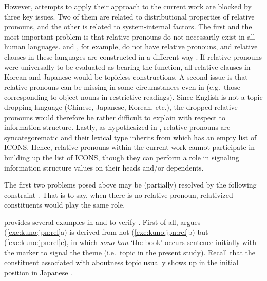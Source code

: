 

However, attempts to apply their approach to the current work are
blocked by three key issues. Two of them are
related to distributional properties of relative pronouns, and the
other is related to system-internal factors.  The first and the most
important problem is that relative pronouns do not necessarily exist
in all human languages.  and , for example,
do not have relative pronouns, and relative clauses in these languages
are constructed in a different way \citep{baldwin:98,kim:park:00}. If
relative pronouns were universally to be evaluated as bearing the
 function, all relative clauses in Korean and Japanese would be
topicless constructions.
A second issue is that relative pronouns can
be missing in some circumstances even in  (e.g.\ those
corresponding to object nouns in restrictive readings). Since English
is not a topic dropping language (Chinese, Japanese, Korean, etc.),
the dropped relative pronouns would therefore be rather difficult to
explain with respect to information structure.
Lastly, as hypothesized in , relative pronouns
are syncategorematic and their lexical type inherits from
 which has an empty list of ICONS. Hence,
relative pronouns within the current work cannot participate in
building up the list of ICONS, though they can perform a role in
signaling information structure values on their heads and/or
dependents.





The first two problems posed above may be (partially) resolved by the
following constraint \citep[19f]{bresnan:mchombo:87}. That is to say, when there is no relative pronoun,
relativized constituents would play the same role.



\noindent \citeauthor{kuno:76} provides several examples in
 and  to verify . First of all,
\citeauthor{kuno:76} argues (\ref{exe:kuno:jpn:rel}a) is derived from
not (\ref{exe:kuno:jpn:rel}b) but (\ref{exe:kuno:jpn:rel}c), in which
\textit{sono hon} `the book' occurs sentence-initially with the 
marker \wa to signal the theme (i.e.\ topic in the present study).
Recall that the constituent associated with aboutness topic usually
shows up in the initial position in Japanese
\citep{maki:etal:99,vermeulen:09}.


